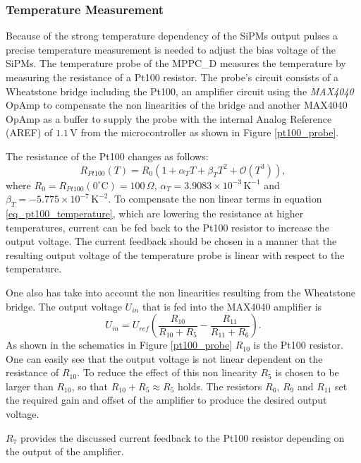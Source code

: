 \documentclass[]{article}
\begin{document}
\subsubsection{Temperature Measurement}

Because of the strong temperature dependency of the SiPMs output pulses a precise temperature measurement is needed to adjust the bias voltage of the SiPMs. The temperature probe of
the MPPC\_D measures the temperature by measuring the resistance of a Pt100 resistor. The probe's circuit consists of a Wheatstone bridge including the Pt100, an amplifier circuit using
the \emph{MAX4040} OpAmp to compensate the non linearities of the bridge and another MAX4040 OpAmp as a buffer to supply the probe with the
internal Analog Reference (AREF) of $1.1\,\text{V}$ from the microcontroller as shown in Figure \ref{pt100_probe}.

The resistance of the Pt100 changes as follows:
	\begin{equation}
		R_{Pt100}(T) = R_0(1 +\alpha_T T + \beta_T T^2 + \mathcal{O}(T^3)),
		\label{eq_pt100_temperature}
	\end{equation}
where $R_0 = R_{Pt100}(0^{\circ} \text{C})=100\,\Omega$, $\alpha_T = 3.9083 \times 10^{-3}\, \text{K}^{-1}$ and $\beta_T = -5.775 \times 10^{-7}\, \text{K}^{-2}$. To compensate 
the non linear terms in equation \ref{eq_pt100_temperature}, which are lowering the resistance at higher temperatures, current can be fed back to the Pt100 resistor to increase 
the output voltage. The current feedback should be chosen in a manner that the resulting output voltage of the temperature probe is linear with respect to the temperature.

One also has take into account the non linearities resulting from the Wheatstone bridge. The output voltage $U_{in}$ that is fed into the MAX4040 amplifier is
	\begin{equation}
		U_{in} = U_{ref}(\frac{R_{10}}{R_{10} + R_5} - \frac{R_{11}}{R_{11} + R_6}).
	\end{equation}
As shown in the schematics in Figure \ref{pt100_probe} $R_{10}$ is the Pt100 resistor. One can easily see that the output voltage is not linear dependent on the resistance
of $R_{10}$. To reduce the effect of this non linearity $R_{5}$ is chosen to be larger than $R_{10}$, so that $R_{10} + R_{5} \approx R_{5}$ holds. The resistors $R_6$, $R_9$ and 
$R_{11}$ set the required gain and offset of the amplifier to produce the desired output voltage. 

$R_7$ provides the discussed current feedback to the Pt100 resistor depending on the output of the amplifier.
\end{document}
